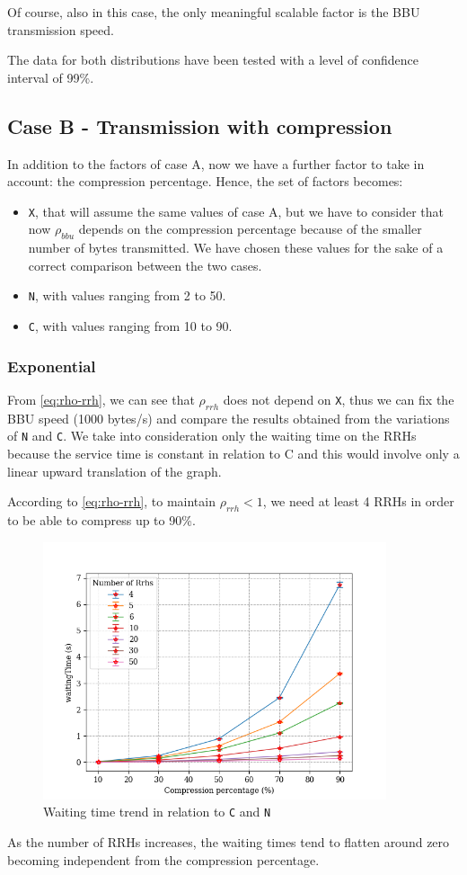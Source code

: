 \documentclass[11pt,a4paper,oneside, openright]{article}
\begin{document}
Of course, also in this case, the only meaningful scalable factor is the BBU transmission speed.

The data for both distributions have been tested with a level of confidence interval of 99\%. 

\subsection{Case B - Transmission with compression}
In addition to the factors of case A, now we have a further factor to take in account: the compression percentage. Hence, the set of factors becomes:

\begin{itemize}
	\item \texttt{X}, that will assume the same values of case A, but we have to consider that now $ \rho_{bbu} $ depends on the compression percentage because of the smaller number of bytes transmitted. We have chosen these values for the sake of a correct comparison between the two cases.
	\item \texttt{N}, with values ranging from 2 to 50.
	\item \texttt{C}, with values ranging from 10 to 90.
\end{itemize}

\subsubsection{Exponential}
From \eqref{eq:rho-rrh}, we can see that $ \rho_{rrh} $ does not depend on \texttt{X}, thus we can fix the BBU speed (1000 bytes/s) and compare the results obtained from the variations of \texttt{N} and \texttt{C}. We take into consideration only the waiting time on the RRHs because the service time is constant in relation to C and this would involve only a linear upward translation of the graph.

According to \eqref{eq:rho-rrh}, to maintain $ \rho_{rrh} < 1$, we need at least 4 RRHs in order to be able to compress up to 90\%.

\begin{figure}[h]
	\centering
	\includegraphics[width=0.9\textwidth]{images/c-vs-waiting}
	\caption{Waiting time trend in relation to \texttt{C} and \texttt{N}}
	\label{fig:c-vs-waiting}
\end{figure}

As the number of RRHs increases, the waiting times tend to flatten around zero becoming independent from the compression percentage.
\end{document}
